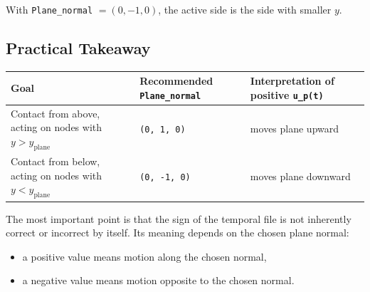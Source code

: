 \documentclass[11pt]{article}
\begin{document}
With \texttt{Plane\_normal} \(= (0,-1,0)\), the active side is the side with
smaller \(y\).

\subsection*{Practical Takeaway}

\begin{center}
\begin{tabular}{|l|l|l|}
\hline
Goal & Recommended \texttt{Plane\_normal} & Interpretation of positive \texttt{u\_p(t)} \\
\hline
Contact from above, acting on nodes with \(y > y_{\text{plane}}\) & \texttt{(0, 1, 0)} & moves plane upward \\
\hline
Contact from below, acting on nodes with \(y < y_{\text{plane}}\) & \texttt{(0, -1, 0)} & moves plane downward \\
\hline
\end{tabular}
\end{center}

The most important point is that the sign of the temporal file is not inherently
correct or incorrect by itself. Its meaning depends on the chosen plane normal:

\begin{itemize}[leftmargin=*]
\item a positive value means motion along the chosen normal,
\item a negative value means motion opposite to the chosen normal.
\end{itemize}
\end{document}
